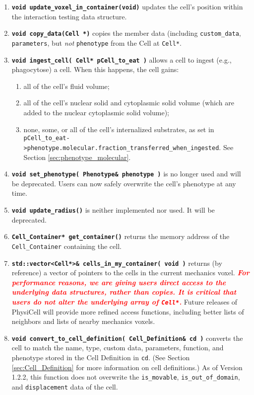 \documentclass[12pt]{article}
\renewcommand{\v}{\verb}
\newcommand{\smallcode}[1]{\textbf{\texttt{#1}}}
\newcommand{\red}[1]{\textcolor{red}{#1}}
\begin{document}
\begin{enumerate}
\item 
\smallcode{void update\_voxel\_in\_container(void)} updates the 
cell's position within the interaction testing data structure. 

\item 
\smallcode{void copy\_data(Cell *)} copies the member data 
(including \v|custom_data|, \v|parameters|, but \emph{not} \v|phenotype| 
from the Cell at \v|Cell*|. 

\item 
\smallcode{void ingest\_cell( Cell* pCell\_to\_eat )} allows a cell 
to ingest (e.g., phagocytose) a cell. When this happens, the cell gains: 
\begin{enumerate}
\item 
all of the cell's fluid volume; 
\item 
all of the cell's nuclear solid and cytoplasmic solid volume (which are added to 
the nuclear cytoplasmic solid volume); 
\item 
none, some, or all of the cell's internalized substrates, as set in \hfill\break 
\v|pCell_to_eat->phenotype.molecular.fraction_transferred_when_ingested|. See 
Section \ref{sec:phenotype_molecular}. 
\end{enumerate}


\item 
\smallcode{void set\_phenotype( Phenotype\& phenotype )} is no longer used 
and will be deprecated. Users can now safely overwrite the cell's phenotype 
at any time. 

\item 
\smallcode{void update\_radius()} is neither implemented nor used. It will 
be deprecated. 

\item 
\smallcode{Cell\_Container* get\_container()} returns the memory 
address of the \v|Cell_Container| containing the cell. 

\item 
\smallcode{std::vector<Cell*>\& cells\_in\_my\_container( void )} returns (by reference) 
a vector of pointers to the cells in the current mechanics voxel. 
\red{\textbf{\emph{For performance reasons, we are giving users direct access to the underlying 
data structures, rather than copies. It is critical that users do not alter the underlying 
array of \texttt{Cell*}.}}} Future releases of PhysiCell will provide more refined 
access functions, including better lists of neighbors and lists of 
nearby mechanics voxels. 

\item 
\smallcode{void convert\_to\_cell\_definition( Cell\_Definition\& cd )} converts 
the cell to match the name, type, custom data, parameters, function, and phenotype 
stored in the Cell Definition in \verb+cd+. (See Section \ref{sec:Cell_Definition} for more 
information on cell definitions.) As of Version 1.2.2, this function does not overwrite 
the \v|is_movable|, \v|is_out_of_domain|, and \v|displacement| data of the cell. 


\end{enumerate}
\end{document}
